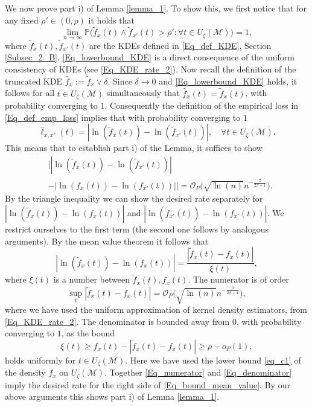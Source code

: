 \documentclass[conference]{IEEEtran}
\begin{document}
We now prove part i) of Lemma \ref{lemma_1}. To show this, we first notice that for any fixed $\rho' \in (0, \rho)$ it holds that 
\begin{equation} \label{Eq_lowerbound_KDE}
    \lim_{n \to \infty} \mathbb{P}\Big( \tilde f_{x}(t) \land \tilde f_{x'}(t) > \rho': \forall t \in U_\zeta (\mathcal{M})\Big) = 1,
\end{equation}
where $\tilde f_{x}(t), \tilde f_{x'}(t) $ are the KDEs defined in \eqref{Eq_def_KDE}, Section \ref{Subsec_2_B}. \eqref{Eq_lowerbound_KDE} is a direct consequence of the uniform consistency of KDEs (see \eqref{Eq_KDE_rate_2}). Now recall the definition of the truncated KDE $\hat f_{x} :=\tilde f_{x} \lor \delta$. Since $\delta \to 0$ and \eqref{Eq_lowerbound_KDE} holds, it follows for all $t \in U_\zeta (\mathcal{M})$ simultaneously that $\hat f_{x}(t) =\tilde f_{x}(t)$, with probability converging to $1$. Consequently the definition of the empirical loss in \eqref{Eq_def_emp_loss} implies that with probability converging to $1$
$$
    \hat \ell_{x,x'}(t) = |\ln(\tilde f_{x}(t))-\ln( \tilde f_{x'}(t)) |, \quad  \forall t \in U_\zeta (\mathcal{M}).
$$
This means that to establish part i) of the Lemma, it suffices to show
\begin{align*}
    & \big||\ln(\tilde f_{x}(t))-\ln( \tilde f_{x'}(t)) |\\
    &-|\ln( f_{x}(t))-\ln(  f_{x'}(t)) |\big| =\mathcal{O}_P \Big( \sqrt{\ln(n)} n^{-\frac{\beta}{2\beta+1}}\Big).
\end{align*}
By the triangle inequality we can show 
the desired rate separately for $|\ln(\tilde f_{x}(t))-\ln( f_{x}(t)) |$ and $|\ln(\tilde f_{x'}(t))-\ln( f_{x'}(t)) |$. We restrict ourselves to the first term (the second one follows by analogous arguments). By the mean value theorem it follows that
\begin{equation} \label{Eq_bound_mean_value}
    |\ln(\tilde f_{x}(t))-\ln( f_{x}(t))| = \frac{|\tilde f_{x}(t)-f_{x}(t)|}{\xi(t)},
\end{equation}
where $\xi(t)$ is a number between $\tilde f_{x}(t), f_{x}(t)$. The numerator is of order
\begin{equation} \label{Eq_numerator}
    \sup_{t} |\tilde f_{x}(t)-f_{x}(t)| = \mathcal{O}_P \Big( \sqrt{\ln(n)} n^{-\frac{\beta}{2\beta+1}}\Big),
\end{equation}
where we have used the uniform approximation of kernel density estimators, from \eqref{Eq_KDE_rate_2}. The denominator is bounded away from $0$, with probability converging to $1$, as the bound
\begin{equation}\label{Eq_denominator}
\xi(t) \ge f_{x}(t) - |\tilde f_{x}(t)-f_{x}(t)| \ge \rho - o_P(1),
\end{equation}
holds uniformly for $t \in U_\zeta(\mathcal{M})$. Here we have used the lower bound \eqref{eq_c1} of the density $f_{x}$ on $U_\zeta(\mathcal{M})$. Together \eqref{Eq_numerator} and \eqref{Eq_denominator} imply the desired rate for the right side of \eqref{Eq_bound_mean_value}. By our above arguments this shows part i) of Lemma \ref{lemma_1}.
\end{document}
